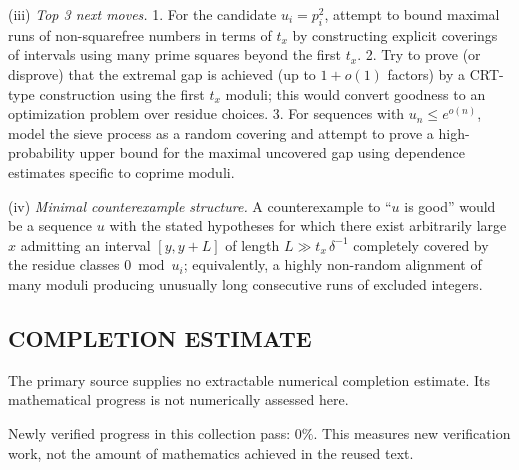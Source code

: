 (iii) \emph{Top 3 next moves.}
1. For the candidate $u_i=p_i^2$, attempt to bound maximal runs of non-squarefree numbers in terms of $t_x$ by constructing explicit coverings of intervals using many prime squares beyond the first $t_x$.
2. Try to prove (or disprove) that the extremal gap is achieved (up to $1+o(1)$ factors) by a CRT-type construction using the first $t_x$ moduli; this would convert goodness to an optimization problem over residue choices.
3. For sequences with $u_n\le e^{o(n)}$, model the sieve process as a random covering and attempt to prove a high-probability upper bound for the maximal uncovered gap using dependence estimates specific to coprime moduli.

(iv) \emph{Minimal counterexample structure.} A counterexample to ``$u$ is good'' would be a sequence $u$ with the stated hypotheses for which there exist arbitrarily large $x$ admitting an interval $[y,y+L]$ of length $L\gg t_x\,\delta^{-1}$ completely covered by the residue classes $0\bmod u_i$; equivalently, a highly non-random alignment of many moduli producing unusually long consecutive runs of excluded integers.




\subsection*{COMPLETION ESTIMATE}
The primary source supplies no extractable numerical completion estimate. Its mathematical progress is not numerically assessed here.

Newly verified progress in this collection pass: $0\%$. This measures new verification work, not the amount of mathematics achieved in the reused text.
